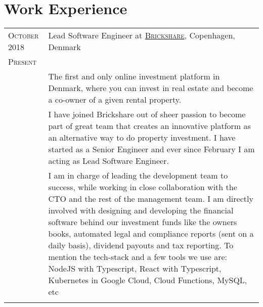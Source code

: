 \documentclass[a4paper,10pt]{article}
\begin{document}
\section{Work Experience}
\begin{longtable}{p{2.5cm}|p{11cm}}

 \raggedleft \textsc{October 2018} & Lead Software Engineer at
 \textsc{\href{https://www.brickshare.dk/}{Brickshare}}, Copenhagen, Denmark
 \\\raggedleft \textsc{Present}\\& 
 \footnotesize{The first and only online investment platform in Denmark, where you can invest in real estate and become a co-owner of a given rental property.}\\

& \footnotesize{I have joined Brickshare out of sheer passion to become part of great team that creates an innovative platform as an alternative way to do property investment. I have started as a Senior Engineer and ever since February I am acting as Lead Software Engineer.}\\
& \footnotesize{I am in charge of leading the development team to success, while working in close collaboration with the CTO and the rest of the management team. I am directly involved with designing and developing the financial software behind our investment funds like the owners books, automated legal and compliance reports (sent on a daily basis), dividend payouts and tax reporting. To mention the tech-stack and a few tools we use are: NodeJS with Typescript, React with Typescript, Kubernetes in Google Cloud, Cloud Functions, MySQL, etc}\\
\multicolumn{2}{c}{} \\ 


\end{longtable}
\end{document}
